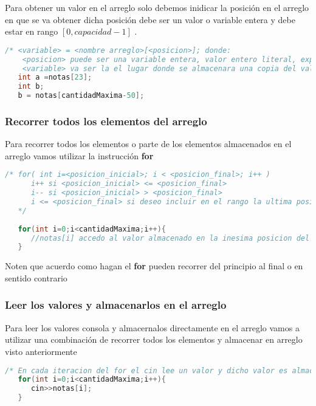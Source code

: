 Para obtener un valor en el arreglo solo debemos inidicar la posición en el arreglo en que se va obtener dicha posición debe ser un valor o variable entera y debe estar en rango $[0,capacidad-1]$ .

\begin{lstlisting}[language=C++]
   /* <variable> = <nombre arreglo>[<posicion>]; donde:
    <posicion> puede ser una variable entera, valor entero literal, expresion cuyo resultado sea entero 
    <variable> va ser la el lugar donde se almacenara una copia del valor solicitado al arreglo, debe ser del mismo tipo de dato del arreglo */
   int a =notas[23];
   int b;
   b = notas[cantidadMaxima-50];
\end{lstlisting}

\subsubsection{Recorrer todos los elementos del arreglo}

Para recorrer todos los elementos o parte de los elementos almacenados en el arreglo vamos utilizar la instrucción \textbf{for}

\begin{lstlisting}[language=C++]
   /* for( int i=<posicion_inicial>; i < <posicion_final>; i++ ) 
      i++ si <posicion_inicial> <= <posicion_final>
      i-- si <posicion_inicial> > <posicion_final>
      i <= <posicion_final> si deseo incluir en el rango la ultima posicion pero tiene que ser una posicion valida del arreglo
   */	
	
   for(int i=0;i<cantidadMaxima;i++){
      //notas[i] accedo al valor almacenado en la inesima posicion del arreglo
   }
\end{lstlisting}

Noten que acuerdo como hagan el \textbf{for} pueden recorrer del principio al final o en sentido contrario

\subsubsection{Leer los valores y almacenarlos en el arreglo}

Para leer los valores consola y almacernalos directamente en el arreglo vamos a utilizar una combinación de recorrer todos los elementos y almacenar en arreglo visto anteriormente

\begin{lstlisting}[language=C++]
   /* En cada iteracion del for el cin lee un valor y dicho valor es almacenado en el arreglo en la posicion que indique el valor de la variable i en esa iteracion, en la primera el valor seria 0, en la segunda 1 y asi sucesivamente. Tener en cuenta que los valores de i esten en rango de posiciones validas del arreglo */
   for(int i=0;i<cantidadMaxima;i++){
      cin>>notas[i];
   }
\end{lstlisting}

